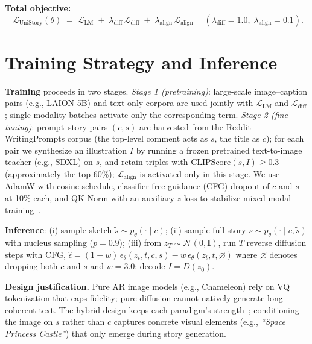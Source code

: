 \documentclass{article}
\begin{document}
\noindent\textbf{Total objective:}
\begin{equation}
\boxed{\;\mathcal{L}_{\text{UniStory}}(\theta) \;=\; \mathcal{L}_{\text{LM}} \;+\; \lambda_{\text{diff}}\,\mathcal{L}_{\text{diff}} \;+\; \lambda_{\text{align}}\,\mathcal{L}_{\text{align}}\;}
\quad (\lambda_{\text{diff}}{=}1.0,\; \lambda_{\text{align}}{=}0.1).
\end{equation}

\section{Training Strategy and Inference}
\label{sec:train}

\textbf{Training} proceeds in two stages. \emph{Stage 1 (pretraining)}: large-scale image--caption pairs (e.g., LAION-5B) and text-only corpora are used jointly with $\mathcal{L}_{\text{LM}}$ and $\mathcal{L}_{\text{diff}}$; single-modality batches activate only the corresponding term. \emph{Stage 2 (fine-tuning)}: prompt--story pairs $(c, s)$ are harvested from the Reddit WritingPrompts corpus (the top-level comment acts as $s$, the title as $c$); for each pair we synthesize an illustration $I$ by running a frozen pretrained text-to-image teacher (e.g., SDXL) on $s$, and retain triples with $\text{CLIPScore}(s, I)\!\geq\!0.3$ (approximately the top 60\%); $\mathcal{L}_{\text{align}}$ is activated only in this stage. We use AdamW with cosine schedule, classifier-free guidance (CFG) dropout of $c$ and $s$ at 10\% each, and QK-Norm with an auxiliary $z$-loss to stabilize mixed-modal training~\citep{team2024chameleon}.

\textbf{Inference}: (i) sample sketch $\tilde{s}\!\sim\! p_\theta(\cdot\mid c)$; (ii) sample full story $s\!\sim\!p_\theta(\cdot\mid c,\tilde{s})$ with nucleus sampling ($p{=}0.9$); (iii) from $z_T\!\sim\!\mathcal{N}(0,\mathbf{I})$, run $T$ reverse diffusion steps with CFG, $\hat{\epsilon} = (1{+}w)\,\epsilon_\theta(z_t,t,c,s) - w\,\epsilon_\theta(z_t,t,\varnothing)$ where $\varnothing$ denotes dropping both $c$ and $s$ and $w{=}3.0$; decode $I=D(z_0)$.

\textbf{Design justification.} Pure AR image models (e.g., Chameleon) rely on VQ tokenization that caps fidelity; pure diffusion cannot natively generate long coherent text. The hybrid design keeps each paradigm's strength~\citep{zhang2025unified}; conditioning the image on $s$ rather than $c$ captures concrete visual elements (e.g., \emph{``Space Princess Castle''}) that only emerge during story generation.

\setlength{\bibsep}{2pt plus 0.3ex}
{\scriptsize


}
\end{document}
